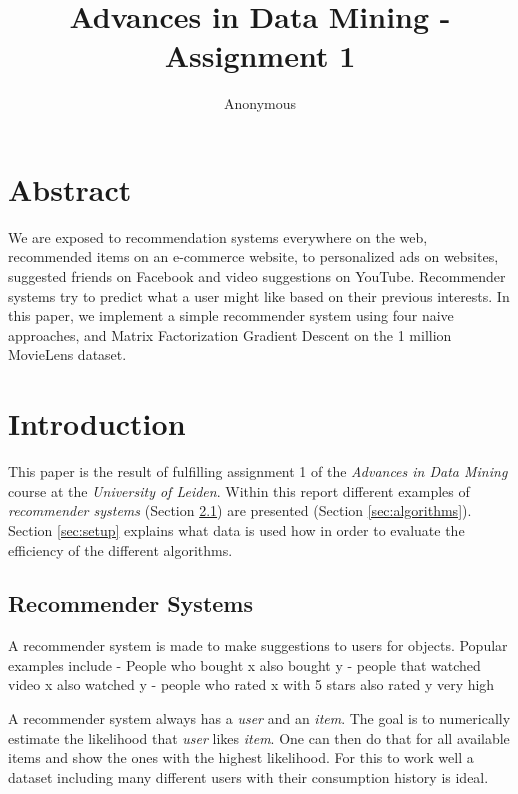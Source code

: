 \documentclass{article}[]
\begin{document}
	\title{Advances in Data Mining - Assignment 1}
	\author{Anonymous}
	\maketitle
	\lstset{
		basicstyle=\ttfamily,
		keywordstyle=\bfseries,
		language=Java,
		frame=single,
		aboveskip=11pt,
		belowskip=11pt,
		breaklines=true,
		breakatwhitespace=false,
		showspaces=false,
		showstringspaces=false,
		numbers=left,
		stepnumber=1,    
		firstnumber=1,
		numberfirstline=true
	}

\section{Abstract}
We are exposed to recommendation systems everywhere on the web, recommended items on an e-commerce website, to personalized ads on websites, suggested friends on Facebook and video suggestions on YouTube. Recommender systems try to predict what a user might like based on their previous interests. In this paper, we implement a simple recommender system using four naive approaches, and Matrix Factorization Gradient Descent on the 1 million MovieLens dataset. 

\section{Introduction}
This paper is the result of fulfilling assignment 1 of the \emph{Advances in Data Mining} course at the \emph{University of Leiden}.
Within this report different examples of \emph{recommender systems} (Section \ref{sec:recommender}) are presented (Section \ref{sec:algorithms}). Section \ref{sec:setup} explains what data is used how in order to evaluate the efficiency of the different algorithms.

\subsection{Recommender Systems}
\label{sec:recommender}
A recommender system is made to make suggestions to users for objects.\cite{miller2003movielens}
Popular examples include
- People who bought x also bought y
- people that watched video x also watched y
- people who rated x with 5 stars also rated y very high

A recommender system always has a \emph{user} and an \emph{item}. The goal is to numerically estimate the likelihood that \emph{user} likes \emph{item}. One can then do that for all available items and show the ones with the highest likelihood.
For this to work well a dataset including many different users with their consumption history is ideal.
\end{document}
